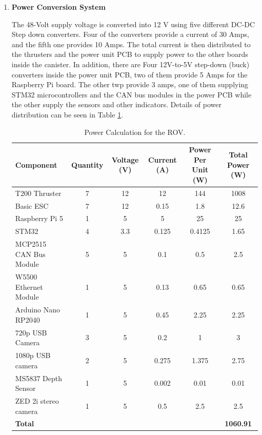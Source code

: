 \vspace{-0.5\baselineskip}
\begin{enumerate}[label=(\roman*), leftmargin=0pt, itemindent=20pt]
    \setlength{\itemsep}{0pt}
    \item \textbf{Power Conversion System}
    
    The 48-Volt supply voltage is converted into 12 V using five different DC-DC Step down converters. Four of the converters provide a current of 30 Amps, and the fifth one provides 10 Amps. The total current is then distributed to the thrusters and the power unit PCB to supply power to the other boards inside the canister. In addition, there are Four 12V-to-5V step-down (buck) converters inside the power unit PCB, two of them provide 5 Amps for the Raspberry Pi board. The other twp provide 3 amps, one of them supplying STM32 microcontrollers and the CAN bus modules in the power PCB while the other supply the sensors and other indicators. Details of power distribution can be seen in Table \ref{tab:power_calculation}.

    \begin{table}[hb!]
        \centering
        \begin{adjustbox}{max width=0.9\columnwidth}
        \begin{tabular}{@{} l *{5}{c} @{}}
          \toprule
          \textbf{Component} & \textbf{Quantity} & \textbf{Voltage (V)} & \textbf{Current (A)} & \textbf{Power Per Unit (W)} & \textbf{Total Power (W)} \\
          \midrule
          T200 Thruster            & 7 & 12   & 12     & 144    & 1008   \\
          Basic ESC                & 7 & 12   & 0.15   & 1.8    & 12.6   \\
          Raspberry Pi 5           & 1 & 5    & 5      & 25     & 25     \\
          STM32                    & 4 & 3.3  & 0.125  & 0.4125 & 1.65   \\
          MCP2515 CAN Bus Module   & 5 & 5    & 0.1    & 0.5    & 2.5    \\
          W5500 Ethernet Module    & 1 & 5    & 0.13   & 0.65   & 0.65   \\
          Arduino Nano RP2040      & 1 & 5    & 0.45   & 2.25   & 2.25   \\
          720p USB Camera          & 3 & 5    & 0.2    & 1      & 3      \\
          1080p USB camera         & 2 & 5    & 0.275  & 1.375  & 2.75   \\
          MS5837 Depth Sensor      & 1 & 5    & 0.002  & 0.01   & 0.01   \\
          ZED 2i stereo camera     & 1 & 5    & 0.5    & 2.5    & 2.5    \\
          \midrule
         \multicolumn{5}{l}{\textbf{Total}} & \textbf{1060.91} \\
          \bottomrule
        \end{tabular}
        \end{adjustbox}
    \caption{Power Calculation for the ROV.}
    \label{tab:power_calculation}
    \end{table}


\end{enumerate}
